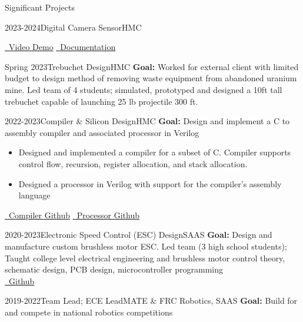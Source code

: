 \documentclass[]{mcdowellcv}
\begin{document}
\begin{cvsection}{Significant Projects}
\begin{cvsubsection}{2023-2024}{Digital Camera Sensor}{HMC}
\begin{itemize}
		\end{itemize}
		\href{https://www.youtube.com/shorts/lJYW2ZMiyLE}{\faYoutube \ Video Demo}
		\href{https://kavidey.github.io/NeoObscura/}{\faBook \ Documentation}
	\end{cvsubsection}
	\begin{cvsubsection}{Spring 2023}{\hypertarget{trebuchet_design}{Trebuchet Design}}{HMC}
		\textbf{Goal:} Worked for external client with limited budget to design method of removing waste equipment from abandoned uranium mine.
		Led team of 4 students; simulated, prototyped and designed a 10ft tall trebuchet capable of launching 25 lb projectile 300 ft.
	\end{cvsubsection}
	\newpage
	\begin{cvsubsection}{2022-2023}{Compiler \& Silicon Design}{HMC}
		\textbf{Goal:} Design and implement a C to assembly compiler and associated processor in Verilog
		\begin{itemize}
			\item Designed and implemented a compiler for a subset of C. Compiler supports control flow, recursion, register allocation, and stack allocation.
			\item Designed a processor in Verilog with support for the compiler's assembly language
		\end{itemize}
		\href{https://github.com/kavidey/HMMM-Compiler/}{\faGithub \ Compiler Github}
		\href{https://github.com/kavidey/Hmmm-Silicon/tree/main/verilog/rtl/hmmm/}{\faGithub \ Processor Github}
	\end{cvsubsection}
	\begin{cvsubsection}{2020-2023}{Electronic Speed Control (ESC) Design}{SAAS}
		\textbf{Goal:} Design and manufacture custom brushless motor ESC. Led team (3 high school students); Taught college level electrical engineering and brushless motor control theory, schematic design, PCB design, microcontroller programming
		\\
		\href{https://github.com/redshiftrobotics/blueshift-esc}{\faGithub \ Github}
	\end{cvsubsection}
	\begin{cvsubsection}{2019-2022}{Team Lead; ECE Lead}{MATE \& FRC Robotics, SAAS}
		\textbf{Goal:} Build for and compete in national robotics competitions
		\begin{itemize}

\end{itemize}
\end{cvsubsection}
\end{cvsection}
\end{document}
